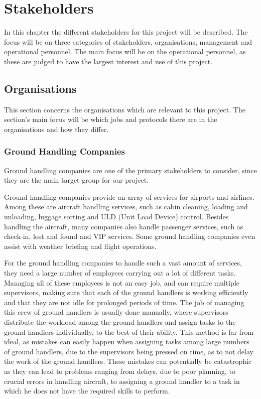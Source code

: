 \chapter{Stakeholders}
In this chapter the different stakeholders for this project will be described. The focus will be on three categories of stakeholders, organisations, management and operational personnel. The main focus will be on the operational personnel, as these are judged to have the largest interest and use of this project.
\section{Organisations}
This section concerns the organisations which are relevant to this project. The section's main focus will be which jobs and protocols there are in the organisations and how they differ.
\subsection{Ground Handling Companies}
Ground handling companies are one of the primary stakeholders to consider, since they are the main target group for our project.

Ground handling companies provide an array of services for airports and airlines. Among these are aircraft handling services, such as cabin cleaning, loading and unloading, luggage sorting and ULD (Unit Load Device) control. Besides handling the aircraft, many companies also handle passenger services, such as check-in, lost and found and VIP services. Some ground handling companies even assist with weather briefing and flight operations.

For the ground handling companies to handle such a vast amount of services, they need a large number of employees carrying out a lot of different tasks. Managing all of these employees is not an easy job, and can require multiple supervisors, making sure that each of the ground handlers is working efficiently and that they are not idle for prolonged periods of time. The job of managing this crew of ground handlers is usually done manually, where supervisors distribute the workload among the ground handlers and assign tasks to the ground handlers individually, to the best of their ability.
This method is far from ideal, as mistakes can easily happen when assigning tasks among large numbers of ground handlers, due to the supervisors being pressed on time, as to not delay the work of the ground handlers. These mistakes can potentially be catastrophic as they can lead to problems ranging from delays, due to poor planning, to crucial errors in handling aircraft, to assigning a ground handler to a task in which he does not have the required skills to perform.

